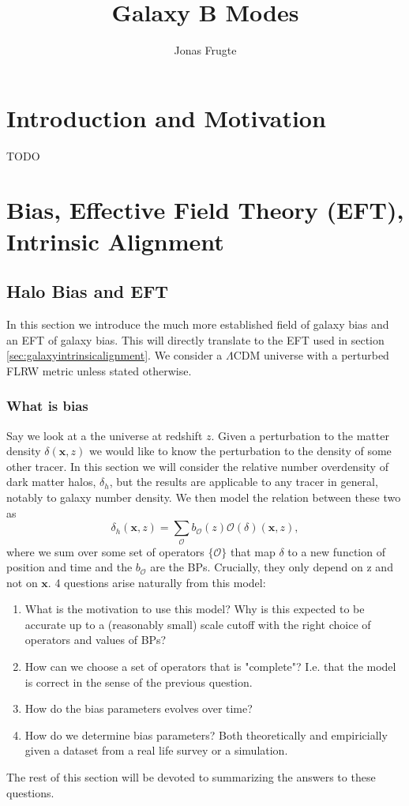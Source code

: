 \documentclass[11pt]{book}
\title{Galaxy B Modes}
\author{Jonas Frugte}
\begin{document}
\maketitle

\setcounter{tocdepth}{1}
\tableofcontents

\chapter{Introduction and Motivation}
TODO

\chapter{Bias, Effective Field Theory (EFT), Intrinsic Alignment}
\section{Halo Bias and EFT}
In this section we introduce the much more established field of galaxy bias and an EFT of galaxy bias. This will directly translate to the EFT used in section \ref{sec:galaxyintrinsicalignment}. We consider a $\Lambda$CDM universe with a perturbed FLRW metric unless stated otherwise.

\subsection{What is bias}
Say we look at a the universe at redshift $z$. Given a perturbation to the matter density $\delta(\mathbf x, z)$ we would like to know the perturbation to the density of some other tracer. In this section we will consider the relative number overdensity of dark matter halos, $\delta_h$, but the results are applicable to any tracer in general, notably to galaxy number density. We then model the relation between these two as
\begin{equation}
    \delta_h(\mathbf x, z) = \sum_{\mathcal O} b_{\mathcal O}(z) \mathcal O(\delta)(\mathbf x, z),
\end{equation}
where we sum over some set of operators $\{\mathcal O\}$ that map $\delta$ to a new function of position and time and the $b_{\mathcal O}$ are the BPs. Crucially, they only depend on z and not on $\mathbf x$. 4 questions arise naturally from this model:
\begin{enumerate}
    \item What is the motivation to use this model? Why is this expected to be accurate up to a (reasonably small) scale cutoff with the right choice of operators and values of BPs?
    \item How can we choose a set of operators that is "complete"? I.e. that the model is correct in the sense of the previous question.
    \item How do the bias parameters evolves over time?
    \item How do we determine bias parameters? Both theoretically and empiricially given a dataset from a real life survey or a simulation.
\end{enumerate}
The rest of this section will be devoted to summarizing the answers to these questions.
\end{document}
